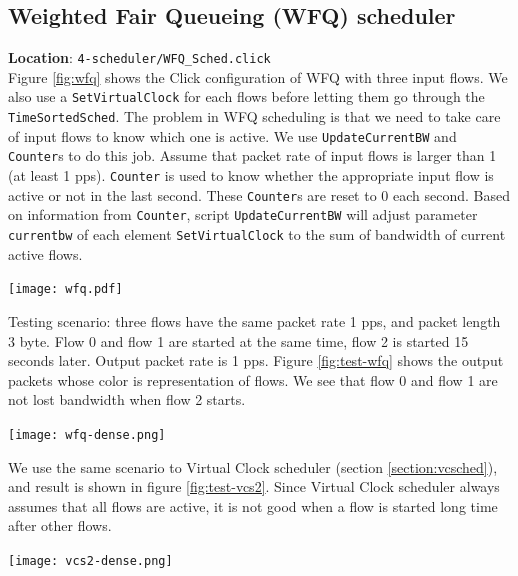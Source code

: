 \documentclass[a4paper]{article}
\begin{document}
  \subsection{Weighted Fair Queueing (WFQ) scheduler}
  \textbf{Location}: \texttt{4-scheduler/WFQ\_Sched.click}\\
  Figure \ref{fig:wfq} shows the Click configuration of WFQ with three input flows. We also use a \texttt{SetVirtualClock} for each flows before letting them go through the \texttt{TimeSortedSched}. The problem in WFQ scheduling is that we need to take care of input flows to know which one is active. We use \texttt{UpdateCurrentBW} and \texttt{Counter}s to do this job. Assume that packet rate of input flows is larger than 1 (at least 1 pps). \texttt{Counter} is used to know whether the appropriate input flow is active or not in the last second. These \texttt{Counter}s are reset to 0 each second. Based on information from \texttt{Counter}, script \texttt{UpdateCurrentBW} will adjust parameter \texttt{currentbw} of each element \texttt{SetVirtualClock} to the sum of bandwidth of current active flows.
  \begin{center}
	\texttt{[image: wfq.pdf]}
	\label{fig:wfq}
  \end{center}
Testing scenario: three flows have the same packet rate 1 pps, and packet length 3 byte. Flow 0 and flow 1 are started at the same time, flow 2 is started 15 seconds later. Output packet rate is 1 pps. Figure \ref{fig:test-wfq} shows the output packets whose color is representation of flows. We see that flow 0 and flow 1 are not lost bandwidth when flow 2 starts. 
  \begin{center}
	\texttt{[image: wfq-dense.png]}
	\label{fig:test-wfq}
  \end{center}
  
We use the same scenario to Virtual Clock scheduler (section \ref{section:vcsched}), and result is shown in figure \ref{fig:test-vcs2}. Since Virtual Clock scheduler always assumes that all flows are active, it is not good when a flow is started long time after other flows. 
  \begin{center}
	\texttt{[image: vcs2-dense.png]}
	\label{fig:test-vcs2}
  \end{center}
  
\end{document}
